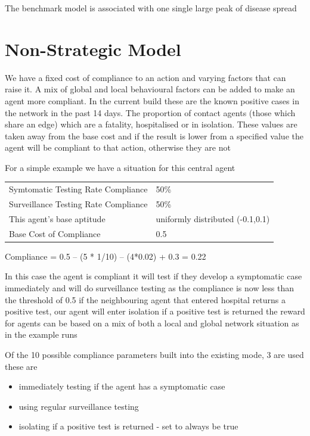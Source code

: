 \documentclass{article}
\begin{document}
The benchmark model is associated with one single large peak of disease spread

\newpage

\section{Non-Strategic Model}
We have a fixed cost of compliance to an action and varying factors that can raise it. A mix of global and local behavioural factors can be added to make an agent more compliant. In the current build these are the known positive cases in the network in the past 14 days. The proportion of contact agents (those which share an edge) which are a fatality, hospitalised or in isolation. These values are taken away from the base cost and if the result is lower from a specified value the agent will be compliant to that action, otherwise they are not

For a simple example we have a situation for this central agent 


\begin{table}[h!]
\begin{tabular}{ll}
Symtomatic Testing Rate Compliance & 50\% \\
Surveillance Testing Rate Compliance & 50\% \\
This agent’s base aptitude & uniformly distributed (-0.1,0.1) \\
Base Cost of Compliance & 0.5 
\end{tabular}
\end{table}

Compliance = 0.5 – (5 * 1/10) – (4*0.02) + 0.3 = 0.22



In this case the agent is compliant
it will test if they develop a symptomatic case immediately and will do surveillance testing as the compliance is now less than the threshold of 0.5
if the neighbouring agent that entered hospital returns a positive test, our agent will enter isolation if a positive test is returned 
the reward for agents can be based on a mix of both a local and global network situation as in the example runs

Of the 10 possible compliance parameters built into the existing mode, 3 are used these are
\begin{itemize}
\item immediately testing if the agent has a symptomatic case
\item using regular surveillance testing
\item isolating if a positive test is returned - set to always be true
\end{itemize}
\end{document}
